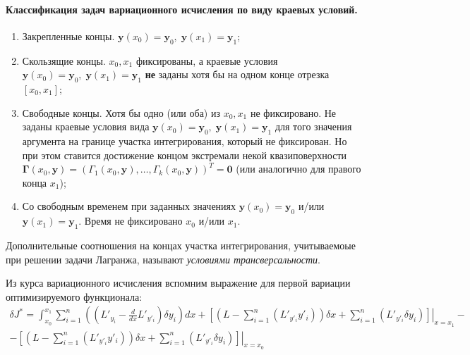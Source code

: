 
\paragraph{Классификация задач вариационного исчисления по виду краевых условий.}
\begin{enumerate}
	\item Закрепленные концы. $\mathbf{y}(x_0)=\mathbf{y}_0,\;\mathbf{y}(x_1)=\mathbf{y}_1$;
	\item Скользящие концы. $x_0, x_1$ фиксированы, а краевые условия $\mathbf{y}(x_0)=\mathbf{y}_0,\;\mathbf{y}(x_1)=\mathbf{y}_1$ \textbf{не} заданы хотя бы на одном конце отрезка $\left[x_0, x_1\right]$;
	\item Свободные концы. Хотя бы одно (или оба) из $x_0, x_1$ не фиксировано. Не заданы краевые условия вида $\mathbf{y}(x_0)=\mathbf{y}_0,\;\mathbf{y}(x_1)=\mathbf{y}_1$ для того значения аргумента на границе участка интегрирования, который не фиксирован. Но при этом ставится достижение концом экстремали некой квазиповерхности $\mathbf{\Gamma}(x_0, \mathbf{y})=\left(\Gamma_1(x_0, \mathbf{y}),\dots,\Gamma_k(x_0, \mathbf{y})\right)^T=\mathbf{0}$ (или аналогично для правого конца $x_1$);
	\item Со свободным временем при заданных значениях $\mathbf{y}(x_0)=\mathbf{y}_0$ и/или $\mathbf{y}(x_1)=\mathbf{y}_1$. Время не фиксировано $x_0$ и/или $x_1$.
\end{enumerate}

Дополнительные соотношения на концах участка интегрирования, учитываемоые при решении задачи Лагранжа, называют \textit{условиями трансверсальности}.

Из курса вариационного исчисления вспомним выражение для первой вариации оптимизируемого функционала:
\begin{multline*}
	\delta J^* = \int_{x_0}^{x_1}\sum_{i=1}^{n} \left(\left(L'_{y_i}-\frac{d}{dx}L'_{y'_i}\right)\delta y_i\right) dx +
	\left.\left[\left(L-\sum_{i=1}^{n}\left(L'_{y'_i}y'_i\right)\right)\delta x + \sum_{i=1}^{n}\left(L'_{y'_i}\delta y_i\right)\right]\right|_{x=x_1} - \\ -
	\left.\left[\left(L-\sum_{i=1}^{n}\left(L'_{y'_i}y'_i\right)\right)\delta x + \sum_{i=1}^{n}\left(L'_{y'_i}\delta y_i\right)\right]\right|_{x=x_0}
\end{multline*}

